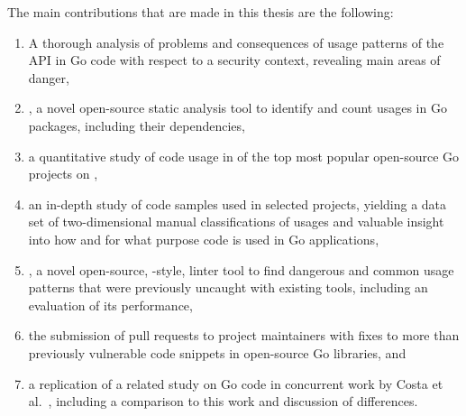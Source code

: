 The main contributions that are made in this thesis are the following:

\begin{enumerate}
    \item A thorough analysis of problems and consequences of usage patterns of the \unsafe{} \acrshort{API} in Go code
    with respect to a security context, revealing  main areas of danger,

    \item \toolGeiger, a novel open-source static analysis tool to identify and count \unsafe{} usages in Go packages,
    including their dependencies,

    \item a quantitative study of \unsafe{} code usage in \projsAnalyzed{} of the top \projsTotal{} most popular
    open-source Go projects on \github{},

    \item an in-depth study of \numberLabeledCodeSnippets{} code samples used in \projsForLabeledCodeSnippets{} selected
    projects, yielding a data set of two-dimensional manual classifications of usages and valuable insight into how and
    for what purpose \unsafe{} code is used in Go applications,

    \item \toolSafer{}, a novel open-source, \toolVet{}-style, linter tool to find  dangerous and common
    \unsafe{} usage patterns that were previously uncaught with existing tools, including an evaluation of its
    performance,

    \item the submission of \numberPRs{} pull requests to project maintainers with fixes to more than
    \numberBugsFixedRounded{} previously vulnerable code snippets in open-source Go libraries, and

    \item a replication of a related study on \unsafe{} Go code in concurrent work by Costa et al.~\cite{costa2020},
    including a comparison to this work and discussion of differences.
\end{enumerate}


